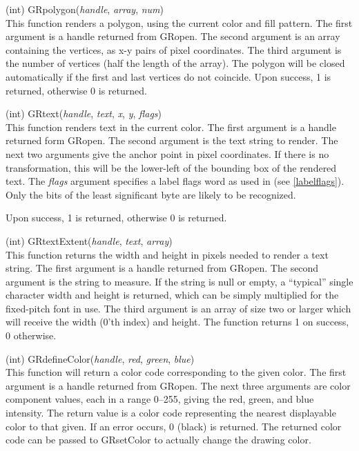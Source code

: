 \begin{description}
\item{(int) \vt GRpolygon({\it handle}, {\it array}, {\it num\/})}\\
This function renders a polygon, using the current color and fill
pattern.  The first argument is a handle returned from {\vt GRopen}. 
The second argument is an array containing the vertices, as x-y pairs
of pixel coordinates.  The third argument is the number of vertices
(half the length of the array).  The polygon will be closed
automatically if the first and last vertices do not coincide.  Upon
success, 1 is returned, otherwise 0 is returned.

\item{(int) \vt GRtext({\it handle}, {\it text}, {\it x}, {\it y},
  {\it flags\/})}\\
This function renders text in the current color.  The first argument
is a handle returned form {\vt GRopen}.  The second argument is the
text string to render.  The next two arguments give the anchor point
in pixel coordinates.  If there is no transformation, this will be the
lower-left of the bounding box of the rendered text.  The {\it flags}
argument specifies a label flags word as used in {\Xic} (see
\ref{labelflags}).  Only the bits of the least significant byte are
likely to be recognized.

Upon success, 1 is returned, otherwise 0 is returned.

\item{(int) \vt GRtextExtent({\it handle}, {\it text}, {\it array\/})}\\
This function returns the width and height in pixels needed to render
a text string.  The first argument is a handle returned from {\vt
GRopen}.  The second argument is the string to measure.  If the string
is null or empty, a ``typical'' single character width and height is
returned, which can be simply multiplied for the fixed-pitch font in
use.  The third argument is an array of size two or larger which will
receive the width (0'th index) and height.  The function returns 1 on
success, 0 otherwise.

\item{(int) \vt GRdefineColor({\it handle}, {\it red}, {\it green},
  {\it blue\/})}\\
This function will return a color code corresponding to the given
color.  The first argument is a handle returned from {\vt GRopen}. 
The next three arguments are color component values, each in a range
0--255, giving the red, green, and blue intensity.  The return value
is a color code representing the nearest displayable color to that
given.  If an error occurs, 0 (black) is returned.  The returned color
code can be passed to {\vt GRsetColor} to actually change the drawing
color.


\end{description}

